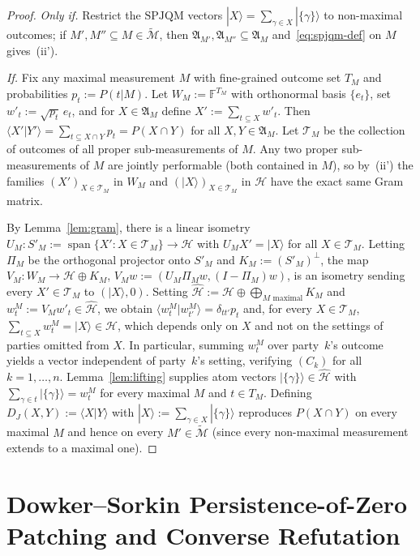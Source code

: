 \documentclass[11pt,a4paper]{article}
\theoremstyle{definition}
\theoremstyle{remark}
\newcommand{\HH}{\mathcal{H}}
\newcommand{\tcM}{\widetilde{\mathcal{M}}}
\newcommand{\EA}{\mathfrak{A}}
\newcommand{\SPJQM}{\mathrm{SPJQM}}
\newcommand{\ket}[1]{|#1\rangle}
\newcommand{\braket}[2]{\langle #1 | #2 \rangle}
\newcommand{\F}{\mathbb{F}}
\begin{document}
\begin{proof}
\emph{Only if.} Restrict the $\SPJQM$ vectors $\ket{X} = \sum_{\gamma \in X}\ket{\{\gamma\}}$ to non-maximal outcomes; if $M', M'' \subseteq M \in \tcM$, then $\EA_{M'}, \EA_{M''} \subseteq \EA_M$ and~\eqref{eq:spjqm-def} on $M$ gives~(ii').

\emph{If.} Fix any maximal measurement $M$ with fine-grained outcome set $T_M$ and probabilities $p_t := P(t|M)$. Let $W_M := \F^{T_M}$ with orthonormal basis $\{e_t\}$, set $w'_t := \sqrt{p_t}\,e_t$, and for $X \in \EA_M$ define $X' := \sum_{t \subseteq X} w'_t$. Then $\braket{X'}{Y'} = \sum_{t \subseteq X \cap Y} p_t = P(X \cap Y)$ for all $X, Y \in \EA_M$. Let $\mathcal{T}_M$ be the collection of outcomes of all proper sub-measurements of $M$. Any two proper sub-measurements of $M$ are jointly performable (both contained in $M$), so by~(ii') the families $(X')_{X \in \mathcal{T}_M}$ in $W_M$ and $(\ket{X})_{X \in \mathcal{T}_M}$ in $\HH$ have the exact same Gram matrix.

By Lemma~\ref{lem:gram}, there is a linear isometry $U_M : S'_M := \operatorname{span}\{X' : X \in \mathcal{T}_M\} \to \HH$ with $U_M X' = \ket{X}$ for all $X \in \mathcal{T}_M$. Letting $\Pi_M$ be the orthogonal projector onto $S'_M$ and $K_M := (S'_M)^\perp$, the map $V_M : W_M \to \HH \oplus K_M$, $V_M w := (U_M \Pi_M w, (I-\Pi_M) w)$, is an isometry sending every $X' \in \mathcal{T}_M$ to $(\ket{X}, 0)$. Setting $\widehat{\HH} := \HH \oplus \bigoplus_{M \text{ maximal}} K_M$ and $w^M_t := V_M w'_t \in \widehat{\HH}$, we obtain $\braket{w^M_t}{w^M_{t'}} = \delta_{tt'} p_t$ and, for every $X \in \mathcal{T}_M$, $\sum_{t \subseteq X} w^M_t = \ket{X} \in \HH$, which depends only on $X$ and not on the settings of parties omitted from $X$. In particular, summing $w^M_t$ over party~$k$'s outcome yields a vector independent of party~$k$'s setting, verifying $(C_k)$ for all $k = 1,\dots,n$. Lemma~\ref{lem:lifting} supplies atom vectors $\ket{\{\gamma\}} \in \widehat{\HH}$ with $\sum_{\gamma \in t} \ket{\{\gamma\}} = w^M_t$ for every maximal $M$ and $t \in T_M$. Defining $D_J(X,Y) := \braket{X}{Y}$ with $\ket{X} := \sum_{\gamma \in X}\ket{\{\gamma\}}$ reproduces $P(X \cap Y)$ on every maximal $M$ and hence on every $M' \in \tcM$ (since every non-maximal measurement extends to a maximal one).
\end{proof}

\section{Dowker--Sorkin Persistence-of-Zero Patching and Converse Refutation}
\label{sec:ds23}
\end{document}
